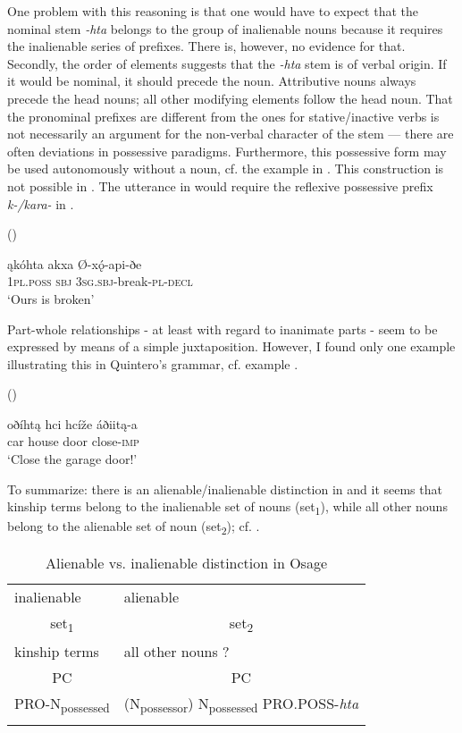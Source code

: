 \documentclass[output=paper]{LSP/langsci}
\begin{document}
One problem with this reasoning is that one would have to expect that the nominal stem \textit{-hta} belongs to the group of inalienable nouns because it requires the inalienable series of prefixes. There is, however, no evidence for that. Secondly, the order of elements suggests that the \textit{-hta} stem is of verbal origin. If it would be nominal, it should precede the  noun. Attributive nouns always precede the head nouns; all other modifying elements follow the head noun. That the pronominal prefixes are different from the ones for stative/inactive verbs is not necessarily an argument for the non-verbal character of the stem --- there are often deviations in possessive paradigms. Furthermore, this possessive form may be used autonomously without a  noun, cf. the example in . This construction is not possible in . The utterance in  would require the reflexive possessive prefix \textit{k-/kara-} in .

\ea	{} (\citealt[413]{Quintero2004}) \label{osagebroken}

\gll ąkóhta     akxa     Ø-xǫ́-api-ðe \\
\textsc{1pl.poss} \textsc{sbj} \textsc{3sg.sbj}-break-\textsc{pl-decl} \\
\glt `Ours is broken'
\z 

Part-whole relationships - at least with regard to inanimate parts - seem to be expressed by means of a simple juxtaposition. However, I found only one example illustrating this in Quintero's grammar, cf. example .

\ea	{} (\citealt[423]{Quintero2004}) \label{osagegarage}

\gll oðíhtą hci      hcíže áðiitą-a \\
car       house door close-\textsc{imp} \\
\glt `Close the garage door!'
\z

To summarize: there is an alienable/inalienable distinction in  and it seems that kinship terms belong to the inalienable set of nouns (set\textsubscript{1}), while all other nouns belong to the alienable set of noun (set\textsubscript{2}); cf. .

\begin{table}
\caption{Alienable vs. inalienable distinction in Osage} \label{osagealienability}
\begin{tabular}{ l l }
\lsptoprule
inalienable & alienable \\
 \multicolumn{1}{c}{set\textsubscript{1}} &  \multicolumn{1}{c}{set\textsubscript{2}} \\
\midrule
 
kinship terms & 	all other nouns ? \\
\midrule
 \multicolumn{1}{c}{PC}	&  \multicolumn{1}{c}{PC} \\
\midrule
PRO-N\textsubscript{possessed} & (N\textsubscript{possessor}) N\textsubscript{possessed} PRO.POSS-\textit{hta} \\
\lspbottomrule
\end{tabular}
\end{table}
\end{document}
